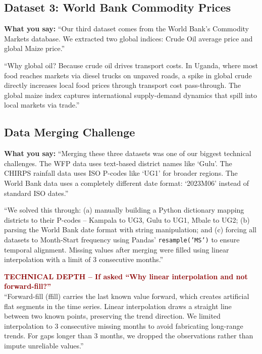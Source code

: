 \documentclass[11pt,a4paper]{article}
\begin{document}
\subsection{Dataset 3: World Bank Commodity Prices}
\textbf{What you say:}
``Our third dataset comes from the World Bank's Commodity Markets database. We extracted two global indices: Crude Oil average price and global Maize price.''

``Why global oil? Because crude oil drives transport costs. In Uganda, where most food reaches markets via diesel trucks on unpaved roads, a spike in global crude directly increases local food prices through transport cost pass-through. The global maize index captures international supply-demand dynamics that spill into local markets via trade.''

\subsection{Data Merging Challenge}
\textbf{What you say:}
``Merging these three datasets was one of our biggest technical challenges. The WFP data uses text-based district names like `Gulu'. The CHIRPS rainfall data uses ISO P-codes like `UG1' for broader regions. The World Bank data uses a completely different date format: `2023M06' instead of standard ISO dates.''

``We solved this through: (a) manually building a Python dictionary mapping districts to their P-codes -- Kampala to UG3, Gulu to UG1, Mbale to UG2; (b) parsing the World Bank date format with string manipulation; and (c) forcing all datasets to Month-Start frequency using Pandas' \texttt{resample('MS')} to ensure temporal alignment. Missing values after merging were filled using linear interpolation with a limit of 3 consecutive months.''

\begin{mdframed}[backgroundcolor=red!5, linecolor=darkred]
\textcolor{darkred}{\textbf{TECHNICAL DEPTH -- If asked ``Why linear interpolation and not forward-fill?''}}\\
``Forward-fill (ffill) carries the last known value forward, which creates artificial flat segments in the time series. Linear interpolation draws a straight line between two known points, preserving the trend direction. We limited interpolation to 3 consecutive missing months to avoid fabricating long-range trends. For gaps longer than 3 months, we dropped the observations rather than impute unreliable values.''
\end{mdframed}
\end{document}
